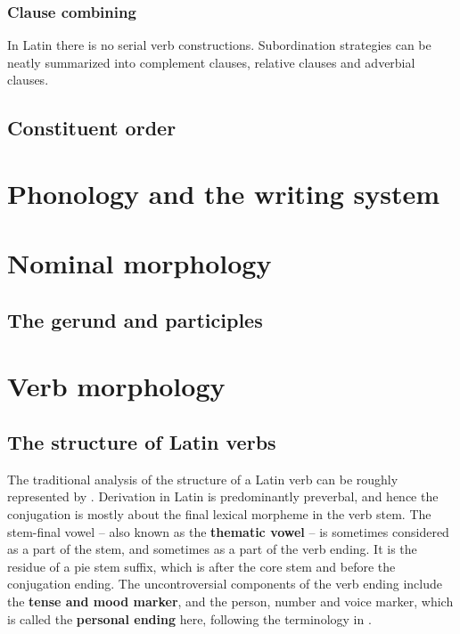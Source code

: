 \documentclass[UTF8, a4paper, oneside]{report}
\newcommand*{\citesec}[1]{\S~{#1}}
\newcommand*{\concept}[1]{\textbf{#1}}
\begin{document}
\subsection{Clause combining}\label{sec:clause-combine-abs}

In Latin there is no serial verb constructions.
Subordination strategies can be neatly summarized into 
complement clauses, relative clauses and adverbial clauses.

\section{Constituent order}\label{sec:constituent-order-abs}


\chapter{Phonology and the writing system}

\chapter{Nominal morphology}

\section{The gerund and participles}\label{sec:gerund-participle-morphology}

\chapter{Verb morphology}

\section{The structure of Latin verbs}

The traditional analysis of the structure of a Latin verb 
can be roughly represented by .
Derivation in Latin is predominantly preverbal,
and hence the conjugation is mostly about the final lexical morpheme in the verb stem.
The stem-final vowel -- also known as the \concept{thematic vowel} -- 
is sometimes considered as a part of the stem,
and sometimes as a part of the verb ending.
It is the residue of a \ac{pie} stem suffix, 
which is after the core stem and before the conjugation ending.
The uncontroversial components of the verb ending include 
the \concept{tense and mood marker},
and the person, number and voice marker,
which is called the \concept{personal ending} here, 
following the terminology in \citet[\citesec{165}]{allen1903allen}.
\end{document}
